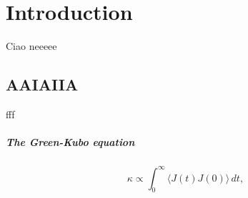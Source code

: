\chapter{Introduction}

Ciao neeeee

\section{AAIAIIA}

fff

\paragraph{The Green-Kubo equation}
\begin{equation}
\kappa\propto\int_{0}^{\infty}\!\langle{J}(t){J}(0)\rangle\, dt, \label{eq:GK}
\end{equation}